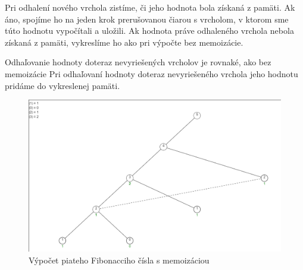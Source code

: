 Pri odhalení nového vrchola zistíme, či jeho hodnota bola získaná z pamäti.
Ak áno, spojíme ho na jeden krok prerušovanou
čiarou s vrcholom, v ktorom sme túto hodnotu vypočítali a uložili. Ak hodnota práve odhaleného vrchola
 nebola získaná z pamäti, vykreslíme ho ako pri výpočte bez memoizácie.

Odhaľovanie hodnoty doteraz nevyriešených vrcholov je rovnaké, ako bez memoizácie
Pri odhaľovaní hodnoty doteraz nevyriešeného vrchola jeho hodnotu pridáme do vykreslenej pamäti.
\begin{figure}[h]
\includegraphics[width=\linewidth]{images/memoizacia.png}
\caption{Výpočet piateho Fibonacciho čísla s memoizáciou}
\label{obr:memo}
\end{figure}
